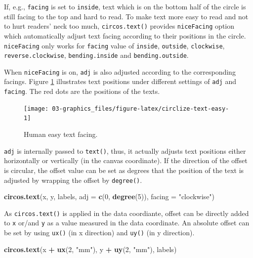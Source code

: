 \documentclass[]{book}
\newenvironment{Shaded}{\begin{snugshade}}{\end{snugshade}}
\newcommand{\KeywordTok}[1]{\textcolor[rgb]{0.13,0.29,0.53}{\textbf{#1}}}
\newcommand{\DataTypeTok}[1]{\textcolor[rgb]{0.13,0.29,0.53}{#1}}
\newcommand{\DecValTok}[1]{\textcolor[rgb]{0.00,0.00,0.81}{#1}}
\newcommand{\StringTok}[1]{\textcolor[rgb]{0.31,0.60,0.02}{#1}}
\newcommand{\OperatorTok}[1]{\textcolor[rgb]{0.81,0.36,0.00}{\textbf{#1}}}
\newcommand{\NormalTok}[1]{#1}
\theoremstyle{definition}
\theoremstyle{definition}
\theoremstyle{remark}
\begin{document}
If, e.g., \texttt{facing} is set to \texttt{inside}, text which is on
the bottom half of the circle is still facing to the top and hard to
read. To make text more easy to read and not to hurt readers' neck too
much, \texttt{circos.text()} provides \texttt{niceFacing} option which
automatically adjust text facing according to their positions in the
circle. \texttt{niceFacing} only works for \texttt{facing} value of
\texttt{inside}, \texttt{outside}, \texttt{clockwise},
\texttt{reverse.clockwise}, \texttt{bending.inside} and
\texttt{bending.outside}.

When \texttt{niceFacing} is on, \texttt{adj} is also adjusted according
to the corresponding facings. Figure \ref{fig:circlize-text-easy}
illustrates text positions under different settings of \texttt{adj} and
\texttt{facing}. The red dots are the positions of the texts.

\begin{figure}

{\centering \texttt{[image: 03-graphics\_files/figure-latex/circlize-text-easy-1]} 

}

\caption{Human easy text facing.}\label{fig:circlize-text-easy}
\end{figure}

\texttt{adj} is internally passed to \texttt{text()}, thus, it actually
adjusts text positions either horizontally or vertically (in the canvas
coordinate). If the direction of the offset is circular, the offset
value can be set as degrees that the position of the text is adjusted by
wrapping the offset by \texttt{degree()}.

\begin{Shaded}
\begin{Highlighting}[]
\KeywordTok{circos.text}\NormalTok{(x, y, labels, }\DataTypeTok{adj =} \KeywordTok{c}\NormalTok{(}\DecValTok{0}\NormalTok{, }\KeywordTok{degree}\NormalTok{(}\DecValTok{5}\NormalTok{)), }\DataTypeTok{facing =} \StringTok{"clockwise"}\NormalTok{)}
\end{Highlighting}
\end{Shaded}

As \texttt{circos.text()} is applied in the data coordiante, offset can
be directly added to \texttt{x} or/and \texttt{y} as a value measured in
the data coordinate. An absolute offset can be set by using
\texttt{ux()} (in x direction) and \texttt{uy()} (in y direction).

\begin{Shaded}
\begin{Highlighting}[]
\KeywordTok{circos.text}\NormalTok{(x }\OperatorTok{+}\StringTok{ }\KeywordTok{ux}\NormalTok{(}\DecValTok{2}\NormalTok{, }\StringTok{"mm"}\NormalTok{), y }\OperatorTok{+}\StringTok{ }\KeywordTok{uy}\NormalTok{(}\DecValTok{2}\NormalTok{, }\StringTok{"mm"}\NormalTok{), labels)}
\end{Highlighting}
\end{Shaded}
\end{document}
